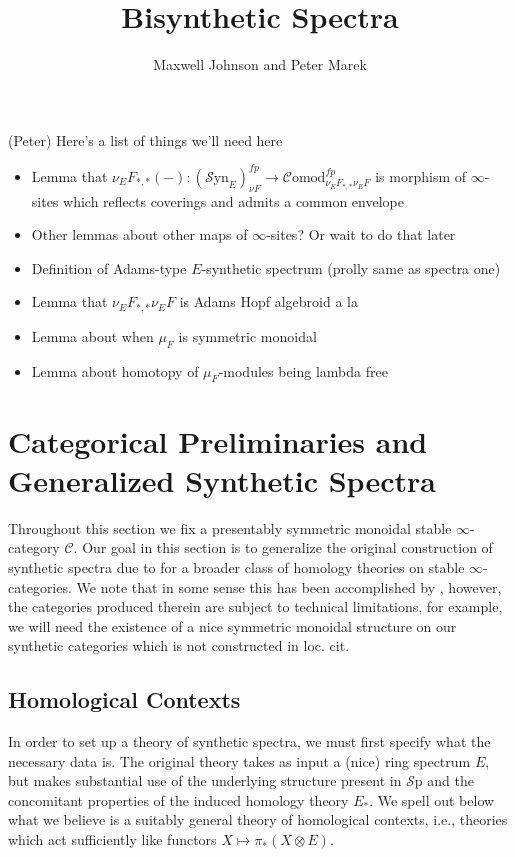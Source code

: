 \documentclass[10pt]{amsart}
\theoremstyle{definition}
\numberwithin{figure}{section}
\numberwithin{equation}{section}
\newcommand{\cC}{\mathcal{C}}
\theoremstyle{cited}
\newcommand{\Sp}{{\mathcal{S}\mathrm{p}}}
\newcommand{\Syn}{\mathcal{S}\mathrm{yn}}
\newcommand{\Comod}{\mathcal{C}\mathrm{omod}}
\begin{document}
\title{Bisynthetic Spectra}
\author{Maxwell Johnson and Peter Marek}

\maketitle

(Peter) Here's a list of things we'll need here
\begin{itemize}
    \item Lemma that $\nu_EF_{*,*}(-):(\Syn_E)_{\nu F}^{fp}\to\Comod_{\nu_EF_{*,*}\nu_EF}^{fp}$ is morphism of $\infty$-sites which reflects coverings and admits a common envelope
    \item Other lemmas about other maps of $\infty$-sites? Or wait to do that later
    \item Definition of Adams-type $E$-synthetic spectrum (prolly same as spectra one)
    \item Lemma that $\nu_EF_{*,*}\nu_EF$ is Adams Hopf algebroid a la \cite[Def. 3.1]{Pst22}
    \item Lemma about when $\mu_F$ is symmetric monoidal
    \item Lemma about homotopy of $\mu_F$-modules being lambda free
\end{itemize}

\section{Categorical Preliminaries and Generalized Synthetic Spectra}

Throughout this section we fix a presentably symmetric monoidal stable $\infty$-category $\cC$. Our goal in this section is to generalize the original construction of synthetic spectra due to \cite{Pst22} for a broader class of homology theories on stable $\infty$-categories. We note that in some sense this has been accomplished by \cite{todo}, however, the categories produced therein are subject to technical limitations, for example, we will need the existence of a nice symmetric monoidal structure on our synthetic categories which is not constructed in loc. cit.

\subsection{Homological Contexts} In order to set up a theory of synthetic spectra, we must first specify what the necessary data is. The original theory takes as input a (nice) ring spectrum $E$, but makes substantial use of the underlying structure present in $\Sp$ and the concomitant properties of the induced homology theory $E_*$. We spell out below what we believe is a suitably general theory of homological contexts, i.e., theories which act sufficiently like functors $X\mapsto \pi_*(X\otimes E)$.
\end{document}
